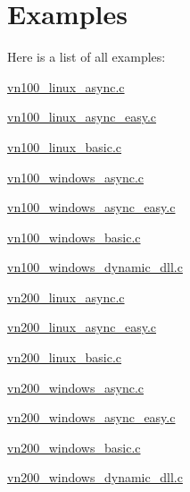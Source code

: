 \section{Examples}
Here is a list of all examples\+:\begin{DoxyCompactItemize}
\item 
\hyperlink{vn100_linux_async_8c-example}{vn100\+\_\+linux\+\_\+async.\+c}
\item 
\hyperlink{vn100_linux_async_easy_8c-example}{vn100\+\_\+linux\+\_\+async\+\_\+easy.\+c}
\item 
\hyperlink{vn100_linux_basic_8c-example}{vn100\+\_\+linux\+\_\+basic.\+c}
\item 
\hyperlink{vn100_windows_async_8c-example}{vn100\+\_\+windows\+\_\+async.\+c}
\item 
\hyperlink{vn100_windows_async_easy_8c-example}{vn100\+\_\+windows\+\_\+async\+\_\+easy.\+c}
\item 
\hyperlink{vn100_windows_basic_8c-example}{vn100\+\_\+windows\+\_\+basic.\+c}
\item 
\hyperlink{vn100_windows_dynamic_dll_8c-example}{vn100\+\_\+windows\+\_\+dynamic\+\_\+dll.\+c}
\item 
\hyperlink{vn200_linux_async_8c-example}{vn200\+\_\+linux\+\_\+async.\+c}
\item 
\hyperlink{vn200_linux_async_easy_8c-example}{vn200\+\_\+linux\+\_\+async\+\_\+easy.\+c}
\item 
\hyperlink{vn200_linux_basic_8c-example}{vn200\+\_\+linux\+\_\+basic.\+c}
\item 
\hyperlink{vn200_windows_async_8c-example}{vn200\+\_\+windows\+\_\+async.\+c}
\item 
\hyperlink{vn200_windows_async_easy_8c-example}{vn200\+\_\+windows\+\_\+async\+\_\+easy.\+c}
\item 
\hyperlink{vn200_windows_basic_8c-example}{vn200\+\_\+windows\+\_\+basic.\+c}
\item 
\hyperlink{vn200_windows_dynamic_dll_8c-example}{vn200\+\_\+windows\+\_\+dynamic\+\_\+dll.\+c}
\end{DoxyCompactItemize}
